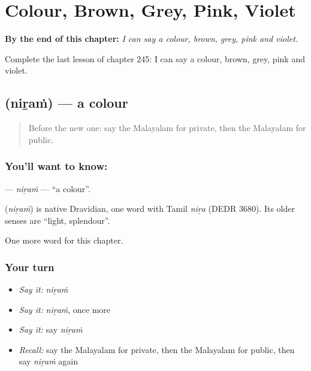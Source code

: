 
\chapter{Colour, Brown, Grey, Pink, Violet}
\label{ch:ml-colour-brown-grey-pink-violet}

\begin{chapteropening}
\textbf{By the end of this chapter:} \emph{I can say a colour, brown, grey, pink and violet.}

Complete the last lesson of chapter 245: I can say a colour, brown, grey, pink and violet.
\end{chapteropening}

\section[\texorpdfstring{\ml{നിറം} (niṟaṁ)}{നിറം (niṟaṁ)}]{ (niṟaṁ) — a colour}

\label{lesson:ML-C245-niram}



\begin{quote}
Before the new one: say the Malayalam for private, then the Malayalam for public.
\end{quote}

\subsection*{You'll want to know: }
\textbf{} — \emph{niṟaṁ} — \textquotedblleft{}a colour\textquotedblright{}.

\begin{cousinweb}
\textbf{} (\emph{niṟaṁ}) is native Dravidian, one word with Tamil \emph{niṟa} (DEDR 3680). Its older senses are \textquotedblleft{}light, splendour\textquotedblright{}.
\end{cousinweb}

\begin{grammarlens}[title={What you've built}]
One more word for this chapter.
\end{grammarlens}

\subsection*{Your turn}
\begin{itemize}
\raggedright
  \item \emph{Say it:} \emph{niṟaṁ}
  \item \emph{Say it:} \emph{niṟaṁ}, once more
  \item \emph{Say it:} say \emph{niṟaṁ}
  \item \emph{Recall:} say the Malayalam for private, then the Malayalam for public, then say \emph{niṟaṁ} again
\end{itemize}

